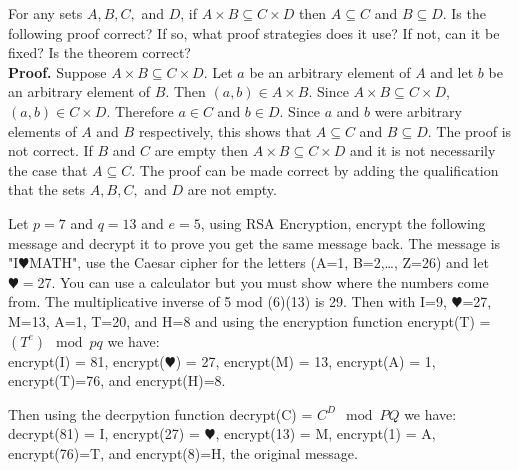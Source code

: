 \documentclass[paper=a4, fontsize=11pt]{jhwhw} %
\begin{document}
For any sets $A, B, C,$ and $D$, if $A\times B\subseteq C\times D$ then $A\subseteq C$ and $B\subseteq D$. Is the following proof correct? If so, what proof strategies does it use? If not, can it be fixed? Is the theorem correct?\\

\textbf{Proof.} Suppose $A\times B\subseteq C\times D$. Let $a$ be an arbitrary element of $A$ and let $b$ be an arbitrary element of $B$. Then $(a, b)\in A\times B$. Since $A\times B\subseteq C\times D$, $(a, b)\in C\times D$. Therefore $a\in C$ and $b\in D$. Since $a$ and $b$ were arbitrary elements of $A$ and $B$ respectively, this shows that $A\subseteq C$ and $B\subseteq D$.
\solution
The proof is not correct. If $B$ and $C$ are empty then $A\times B\subseteq C\times D$ and it is not necessarily the case that $A\subseteq C$. The proof can be made correct by adding the qualification that the sets $A, B, C,$ and $D$ are not empty.

Let $p=7$ and $q=13$ and $e=5$, using RSA Encryption, encrypt the following message and decrypt it to prove you get the same message back. The message is "I$\varheart$MATH", use the Caesar cipher for the letters (A=1, B=2,\ldots, Z=26) and let $\varheart=$27. You can use a calculator but you must show where the numbers come from.
\solution
The multiplicative inverse of 5 mod (6)(13) is 29. Then with I=9, $\varheart$=27, M=13, A=1, T=20, and H=8 and using the encryption function encrypt(T) = $(T^e) \mod pq$ we have:\\
encrypt(I) = 81, encrypt($\varheart$) = 27, encrypt(M) = 13, encrypt(A) = 1, encrypt(T)=76, and encrypt(H)=8.

Then using the decrpytion function decrypt(C) = $C^D \mod PQ$ we have:\\
decrypt(81) = I, encrypt(27) = $\varheart$, encrypt(13) = M, encrypt(1) = A, encrypt(76)=T, and encrypt(8)=H, the original message.
\end{document}
